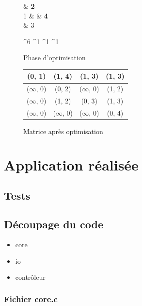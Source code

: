 \documentclass[a4paper,12pt,final] {article}
\begin{document}
\begin{figure}[htpd]
 \centering
 \begin{psmatrix}[mnode=circle]
	    & {\color{red} \bf 2}\\
	 1 &    & {\color{red} \bf 4}\\
	    & 3\\
\end{psmatrix}
	
	^{6}
	^{1}
	^{1}
	^{1}

  \caption{Phase d'optimisation}
\end{figure}

\begin{figure}[htpd]
\begin{center}
\begin{tabular}{|c|c|c|c|}
\hline
(0, 1) & {\color{red} \bf (1, 4)} & (1, 3) & {\color{red} \bf (1, 3)} \\
\hline
($\infty$, 0) & (0, 2) & ($\infty$, 0) & (1, 2) \\
\hline
($\infty$, 0) & (1, 2) & (0, 3) & (1, 3)\\
\hline
($\infty$, 0) & ($\infty$, 0) & ($\infty$, 0) & (0, 4) \\
\hline
\end{tabular}
\end{center}
\caption{Matrice après optimisation}
\end{figure}

\newpage
\section{Application réalisée}
\subsection{Tests}
\subsection{Découpage du code}

\begin{itemize}
\item{core}
\item{io}
\item{contrôleur}
\end{itemize}


\subsubsection{Fichier core.c}

\end{document}
